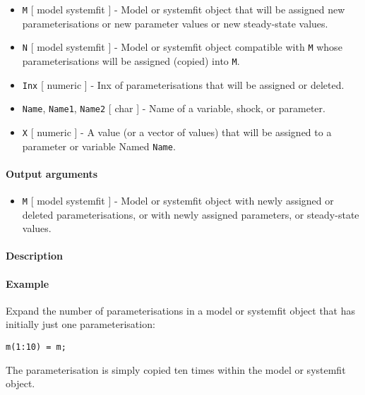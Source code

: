 \begin{itemize}
\item
  \texttt{M} {[} model \textbar{} systemfit {]} - Model or systemfit
  object that will be assigned new parameterisations or new parameter
  values or new steady-state values.
\item
  \texttt{N} {[} model \textbar{} systemfit {]} - Model or systemfit
  object compatible with \texttt{M} whose parameterisations will be
  assigned (copied) into \texttt{M}.
\item
  \texttt{Inx} {[} numeric {]} - Inx of parameterisations that will be
  assigned or deleted.
\item
  \texttt{Name}, \texttt{Name1}, \texttt{Name2} {[} char {]} - Name of a
  variable, shock, or parameter.
\item
  \texttt{X} {[} numeric {]} - A value (or a vector of values) that will
  be assigned to a parameter or variable Named \texttt{Name}.
\end{itemize}

\paragraph{Output arguments}

\begin{itemize}
\itemsep1pt\parskip0pt
\item
  \texttt{M} {[} model \textbar{} systemfit {]} - Model or systemfit
  object with newly assigned or deleted parameterisations, or with newly
  assigned parameters, or steady-state values.
\end{itemize}

\paragraph{Description}

\paragraph{Example}

Expand the number of parameterisations in a model or systemfit object
that has initially just one parameterisation:

\begin{verbatim}
m(1:10) = m;
\end{verbatim}

The parameterisation is simply copied ten times within the model or
systemfit object.


